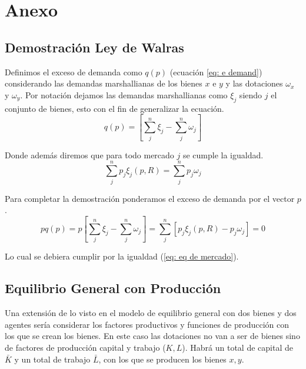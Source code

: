 \chapter{Anexo}

\section{Demostración Ley de Walras}

Definimos el exceso de demanda como $\textit{q}(p)$ (ecuación \ref{eq: e demand}) considerando las demandas marshallianas de los bienes $x$ e $y$ y las dotaciones $\omega_x$ y $\omega_y$. Por notación dejamos las demandas marshallianas como $\xi_j$ siendo $j$ el conjunto de bienes, esto con el fin de generalizar la ecuación. 
\begin{equation}
     \textit{q}(p) =  \left[  \sum ^n _{j} \xi_j - \sum ^n _{j} \omega_j \right] \label{eq: e demand}
\end{equation}

Donde además diremos que para todo mercado $j$ se cumple la igualdad.
\begin{equation}
    \sum ^n _{j} p_j \xi _j(p,R) = \sum ^n _{j} p_j \omega_j \label{eq: eq de mercado}
\end{equation}

Para completar la demostración ponderamos el exceso de demanda por el vector $p$.
\begin{equation}
    p\textit{q}(p) = p \left[  \sum ^n _{j} \xi_j - \sum ^n _{j} \omega_j \right] = \sum ^n _{j} \left[ p_j \xi_j(p,R) - p_j \omega_j    \right] = 0
\end{equation}

Lo cual se debiera cumplir por la igualdad (\ref{eq: eq de mercado}). 


\section{Equilibrio General con Producción}

Una extensión de lo visto en el modelo de equilibrio general con dos bienes y dos agentes sería considerar los factores productivos y funciones de producción con los que se crean los bienes. En este caso las dotaciones no van a ser de bienes sino de factores de producción capital y trabajo ($K,L$). Habrá un total de capital de $\bar{K}$ y un total de trabajo $\bar{L}$, con los que se producen los bienes $x,y$. 

